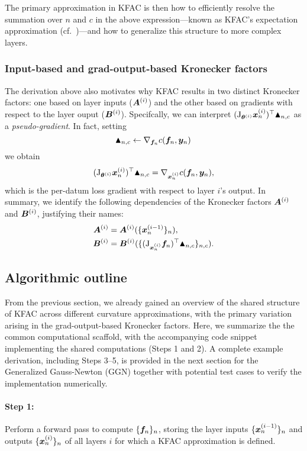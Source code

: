 The primary approximation in KFAC is then how to efficiently resolve the summation over $n$ and $c$ in the above expression---known as KFAC's expectation approximation (cf.~)---and how to generalize this structure to more complex layers.

\subsubsection{Input-based and grad-output-based Kronecker factors}
The derivation above also motivates why KFAC results in two distinct Kronecker factors: one based on layer inputs (${\bm{A}}^{(i)}$) and the other based on gradients with respect to the layer ouput (${\bm{B}}^{(i)}$). Specifcally, we can interpret $(\mathrm{J}_{{\bm{\theta}}^{(i)}} {\bm{x}}_n^{(i)})^{\top} \blacktriangle_{n,c}$ as a \emph{pseudo-gradient}. In fact, setting
$$\blacktriangle_{n,c} \leftarrow \nabla_{{\bm{f}}_n} c({\bm{f}}_n, {\bm{y}}_n)\,$$
we obtain
$$(\mathrm{J}_{{\bm{\theta}}^{(i)}} {\bm{x}}_n^{(i)})^{\top} \blacktriangle_{n,c} = \nabla_{{\bm{x}}_n^{(i)}} c({\bm{f}}_n, {\bm{y}}_n),$$
which is the per-datum loss gradient with respect to layer $i$'s output.
In summary, we identify the following dependencies of the Kronecker factors ${\bm{A}}^{(i)}$ and ${\bm{B}}^{(i)}$, justifying their names:
\begin{align*}
  {\bm{A}}^{(i)} &= {\bm{A}}^{(i)}( \{{\bm{x}}_{n}^{(i-1)}\}_n ),
  \\
  {\bm{B}}^{(i)} &= {\bm{B}}^{(i)}( \{ (\mathrm{J}_{{\bm{x}}_n^{(i)}}{\bm{f}}_{n})^{\top} \blacktriangle_{n,c}\}_{n,c}).
\end{align*}

\subsection{Algorithmic outline}

From the previous section, we already gained an overview of the shared structure of KFAC across different curvature approximations, with the primary variation arising in the grad-output-based Kronecker factors.
Here, we summarize the the common computational scaffold, with the accompanying code snippet implementing the shared computations (Steps 1 and 2).
A complete example derivation, including Steps 3–5, is provided in the next section for the Generalized Gauss-Newton (GGN) together with potential test cases to verify the implementation numerically.

\paragraph{Step 1:} Perform a forward pass to compute $\{{\bm{f}}_n\}_n $, storing the layer inputs $\{{\bm{x}}_n^{(i-1)} \}_n$ and outputs $\{{\bm{x}}_n^{(i)}\}_n$ of all layers $i$ for which a KFAC approximation is defined.

